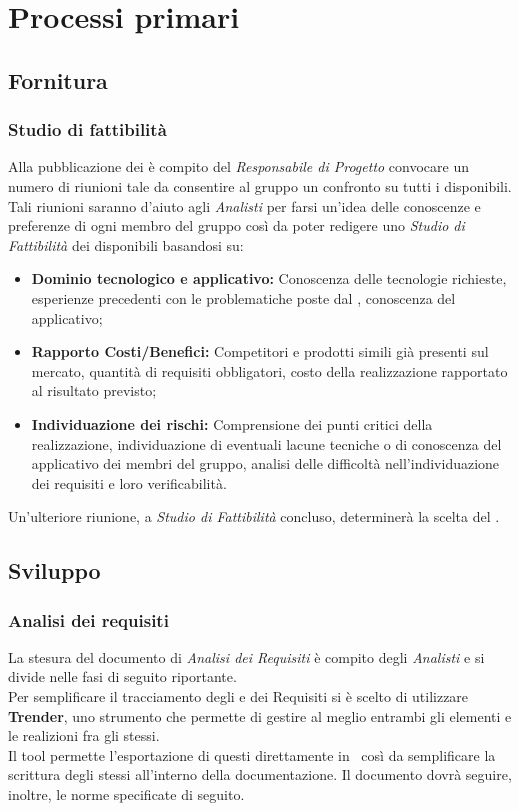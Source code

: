 \section{Processi primari}
	\subsection{Fornitura}
		\subsubsection{Studio di fattibilità}
		Alla pubblicazione dei  è compito del \emph{Responsabile di Progetto} convocare un numero di riunioni tale da consentire
    al gruppo un confronto su tutti i  disponibili.\\
    Tali riunioni saranno d'aiuto agli \emph{Analisti} per farsi un'idea delle conoscenze e preferenze di ogni membro del gruppo così da
    poter redigere uno \emph{Studio di Fattibilità} dei  disponibili basandosi su:\\
    \begin{itemize}
      \item \textbf{Dominio tecnologico e applicativo: }Conoscenza delle tecnologie richieste, esperienze precedenti con le problematiche poste dal , conoscenza del
       applicativo;
      \item \textbf{Rapporto Costi/Benefici: }Competitori e prodotti simili già presenti sul mercato, quantità di requisiti obbligatori, costo della realizzazione rapportato al
      risultato previsto;
      \item \textbf{Individuazione dei rischi: }Comprensione dei punti critici della realizzazione, individuazione di eventuali lacune tecniche o di conoscenza del  applicativo
      dei membri del gruppo, analisi delle difficoltà nell’individuazione dei requisiti e loro verificabilità.
    \end{itemize}
    Un'ulteriore riunione, a \emph{Studio di Fattibilità} concluso, determinerà la scelta del .
	\subsection{Sviluppo}
		\subsubsection{Analisi dei requisiti}
		 La stesura del documento di \emph{Analisi dei Requisiti} è compito degli \emph{Analisti} e si divide nelle fasi di seguito riportante.\\
		 Per semplificare il tracciamento degli  e dei Requisiti si è scelto di utilizzare \textbf{Trender}, uno strumento  che permette
        di gestire al meglio entrambi gli elementi e le realizioni fra gli stessi.\\
        Il tool permette l'esportazione di questi direttamente in \glossaryItem{\LaTeX}\, così da semplificare la scrittura degli stessi all'interno della documentazione.
    Il documento dovrà seguire, inoltre, le norme specificate di seguito.
